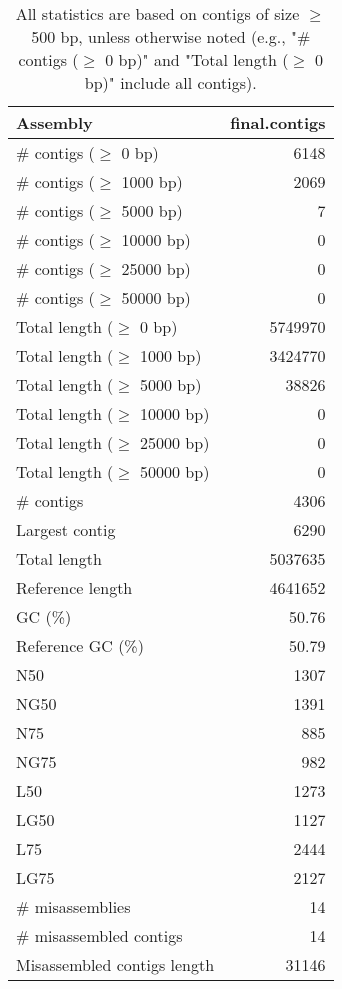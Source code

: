\documentclass[12pt,a4paper]{article}
\begin{document}
\begin{table}[ht]
\begin{center}
\caption{All statistics are based on contigs of size $\geq$ 500 bp, unless otherwise noted (e.g., "\# contigs ($\geq$ 0 bp)" and "Total length ($\geq$ 0 bp)" include all contigs).}
\begin{tabular}{|l*{1}{|r}|}
\hline
Assembly & final.contigs \\ \hline
\# contigs ($\geq$ 0 bp) & 6148 \\ \hline
\# contigs ($\geq$ 1000 bp) & 2069 \\ \hline
\# contigs ($\geq$ 5000 bp) & 7 \\ \hline
\# contigs ($\geq$ 10000 bp) & 0 \\ \hline
\# contigs ($\geq$ 25000 bp) & 0 \\ \hline
\# contigs ($\geq$ 50000 bp) & 0 \\ \hline
Total length ($\geq$ 0 bp) & 5749970 \\ \hline
Total length ($\geq$ 1000 bp) & 3424770 \\ \hline
Total length ($\geq$ 5000 bp) & 38826 \\ \hline
Total length ($\geq$ 10000 bp) & 0 \\ \hline
Total length ($\geq$ 25000 bp) & 0 \\ \hline
Total length ($\geq$ 50000 bp) & 0 \\ \hline
\# contigs & 4306 \\ \hline
Largest contig & 6290 \\ \hline
Total length & 5037635 \\ \hline
Reference length & 4641652 \\ \hline
GC (\%) & 50.76 \\ \hline
Reference GC (\%) & 50.79 \\ \hline
N50 & 1307 \\ \hline
NG50 & 1391 \\ \hline
N75 & 885 \\ \hline
NG75 & 982 \\ \hline
L50 & 1273 \\ \hline
LG50 & 1127 \\ \hline
L75 & 2444 \\ \hline
LG75 & 2127 \\ \hline
\# misassemblies & 14 \\ \hline
\# misassembled contigs & 14 \\ \hline
Misassembled contigs length & 31146 \\ \hline

\end{tabular}
\end{center}
\end{table}
\end{document}
